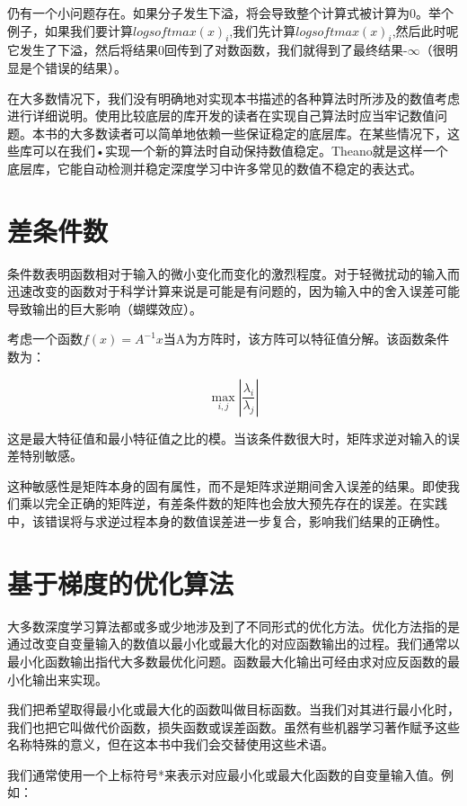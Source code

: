 仍有一个小问题存在。如果分子发生下溢，将会导致整个计算式被计算为0。举个例子，如果我们要计算$logsoftmax(x)_i$,我们先计算$logsoftmax(x)_i$,然后此时呢它发生了下溢，然后将结果0回传到了对数函数，我们就得到了最终结果-$\infty$（很明显是个错误的结果）。

在大多数情况下，我们没有明确地对实现本书描述的各种算法时所涉及的数值考虑进行详细说明。使用比较底层的库开发的读者在实现自己算法时应当牢记数值问题。本书的大多数读者可以简单地依赖一些保证稳定的底层库。在某些情况下，这些库可以在我们•实现一个新的算法时自动保持数值稳定。Theano就是这样一个底层库，它能自动检测并稳定深度学习中许多常见的数值不稳定的表达式。


\section{差条件数}

条件数表明函数相对于输入的微小变化而变化的激烈程度。对于轻微扰动的输入而迅速改变的函数对于科学计算来说是可能是有问题的，因为输入中的舍入误差可能导致输出的巨大影响（蝴蝶效应）。

考虑一个函数$f(x)=A^{-1}x$当A为方阵时，该方阵可以特征值分解。该函数条件数为：

\begin{equation}
\max_{i,j}|\frac{\lambda_i}{\lambda_j}|
\end{equation}

这是最大特征值和最小特征值之比的模。当该条件数很大时，矩阵求逆对输入的误差特别敏感。

这种敏感性是矩阵本身的固有属性，而不是矩阵求逆期间舍入误差的结果。即使我们乘以完全正确的矩阵逆，有差条件数的矩阵也会放大预先存在的误差。在实践中，该错误将与求逆过程本身的数值误差进一步复合，影响我们结果的正确性。

\section{基于梯度的优化算法}

大多数深度学习算法都或多或少地涉及到了不同形式的优化方法。优化方法指的是通过改变自变量输入的数值以最小化或最大化的对应函数输出的过程。我们通常以最小化函数输出指代大多数最优化问题。函数最大化输出可经由求对应反函数的最小化输出来实现。

我们把希望取得最小化或最大化的函数叫做目标函数。当我们对其进行最小化时，我们也把它叫做代价函数，损失函数或误差函数。虽然有些机器学习著作赋予这些名称特殊的意义，但在这本书中我们会交替使用这些术语。

我们通常使用一个上标符号*来表示对应最小化或最大化函数的自变量输入值。例如：

